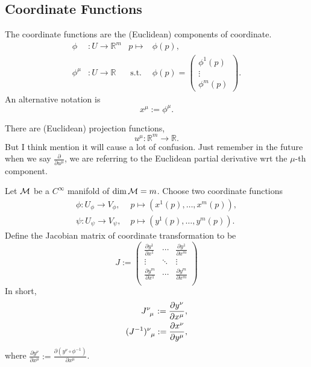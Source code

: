 \documentclass[../main.tex]{subfiles}
\begin{document}
    \subsection{Coordinate Functions}
    \begin{definition}\label{def:coordinate-functions}
        The coordinate functions are the (Euclidean) components of coordinate.
        \begin{align*}
            \phi &: U \to \mathbb{R}^m & p \mapsto &\phi(p), \\
            \phi^\mu &: U \to \mathbb{R} & ~\text{s.t.}~ &\phi(p) = \begin{pmatrix}
            \phi^1(p) \\ \vdots \\ \phi^m(p)
            \end{pmatrix}.
        \end{align*}
        An alternative notation is 
        \[
        x^\mu := \phi^\mu.
        \]
    \end{definition}
    \begin{remark}
        There are (Euclidean) projection functions, 
        \[
        u^\mu : \mathbb{R}^m \to \mathbb{R}.
        \]
        But I think mention it will cause a lot of confusion. Just remember in 
        the future when we say \(\frac{\partial }{\partial u^\mu}\), we are 
        referring to the Euclidean partial derivative wrt the \(\mu\)-th 
        component.
    \end{remark}
    \begin{definition}\label{def:jacobian-matrix}
        Let \(\manifold[M]\) be a \(C^\infty\) manifold of \(\dim \manifold[M]=m\).
        Choose two coordinate functions 
        \[
        \begin{aligned}
            \phi : U_\phi \to V_\phi,& \; p \mapsto (x^1(p), \dots, x^m(p)), \\
            \psi : U_\psi \to V_\psi,& \; p \mapsto (y^1(p), \dots, y^m(p)).
        \end{aligned}
        \]
        Define the Jacobian matrix of coordinate transformation to be
        \[
        J := \begin{pmatrix}
        \frac{\partial y^1}{\partial x^1} & \cdots & \frac{\partial y^1}{\partial x^m} \\
        \vdots                            & \ddots & \vdots                            \\
        \frac{\partial y^m}{\partial x^1} & \cdots & \frac{\partial y^m}{\partial x^m} \\
        \end{pmatrix}
        \]
        In short, 
        \[
        \begin{aligned}
            J\indices{^\nu_\mu} := \frac{\partial y^\nu}{\partial x^\mu}, \\
            (J^{-1})\indices{^\nu_\mu} := \frac{\partial x^\nu}{\partial y^\mu}, 
        \end{aligned}
        \]
        where \(\frac{\partial y^\nu}{\partial x^\mu} := 
        \frac{\partial (y^\nu \circ \phi ^{-1})}{\partial x^\mu}\).
    \end{definition}
    \newpage
\end{document}
